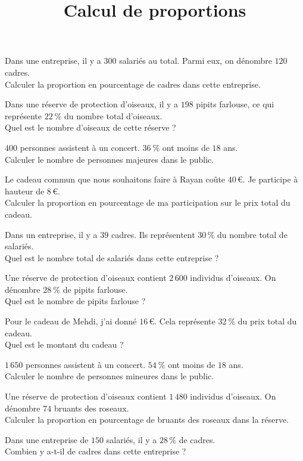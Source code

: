 \documentclass{article}
\title{Calcul de proportions}
\begin{document}
\maketitle

\begin{enumquestions}
    \item Dans une entreprise, il y a $300$ salariés au total. Parmi eux, on dénombre  $120$ cadres. \\Calculer la proportion en pourcentage de cadres dans cette entreprise.
	\item Dans une réserve de protection d'oiseaux, il y a $198$ pipits farlouse, ce qui représente $22~\%$ du nombre total d'oiseaux. \\Quel est le nombre d'oiseaux de cette réserve ?
	\item $400$ personnes assistent à un concert. $36~\%$ ont moins de $18$ ans. \\Calculer le nombre de personnes majeures dans le public.
	\item Le cadeau commun que nous souhaitons faire à Rayan coûte $40$\,\euro{}. Je participe à hauteur de $8$\,\euro{}. \\Calculer la proportion en pourcentage de ma participation sur le prix total du cadeau.
	\item Dans un entreprise, il y a  $39$ cadres. Ils  représentent $30\,\%$ du nombre total de salariés. \\Quel est le nombre total de salariés dans cette entreprise ?
	\item Une réserve de protection d'oiseaux contient $2\,600$ individus d'oiseaux. On dénombre $28~\%$ de pipits farlouse.\\Quel est le nombre de pipits farlouse ?
	\item Pour le cadeau de Mehdi, j'ai donné $16$\,\euro{}. Cela représente $32~\%$ du prix total du cadeau. \\Quel est le montant du cadeau ?
	\item $1\,650$ personnes assistent à un concert. $54~\%$ ont moins de $18$ ans. \\Calculer le nombre de personnes mineures dans le public.
	\item Une réserve de protection d'oiseaux contient $1\,480$ individus d'oiseaux. On dénombre $74$ bruants des roseaux. \\Calculer la proportion en pourcentage de bruants des roseaux dans la réserve.
	\item Dans une entreprise de $150$ salariés, il y a  $28\,\%$ de cadres. \\Combien y a-t-il de cadres dans cette entreprise ?
\end{enumquestions}
\end{document}
